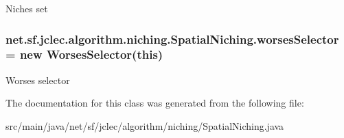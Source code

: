Niches set \hypertarget{classnet_1_1sf_1_1jclec_1_1algorithm_1_1niching_1_1_spatial_niching_acf1e81e044b6cf631ac0741cbc033953}{
\subsubsection[{worses\-Selector}]{ net.\-sf.\-jclec.\-algorithm.\-niching.\-Spatial\-Niching.\-worses\-Selector = new {\bf Worses\-Selector}(this)\hspace{0.3cm}{\ttfamily [protected]}}}\label{classnet_1_1sf_1_1jclec_1_1algorithm_1_1niching_1_1_spatial_niching_acf1e81e044b6cf631ac0741cbc033953}
Worses selector 

The documentation for this class was generated from the following file\-:\begin{DoxyCompactItemize}
\item 
src/main/java/net/sf/jclec/algorithm/niching/Spatial\-Niching.\-java\end{DoxyCompactItemize}
